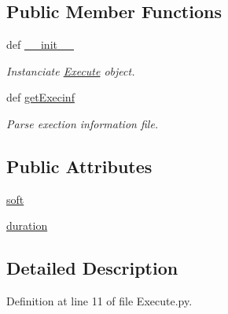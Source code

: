 \subsection*{\-Public \-Member \-Functions}
\begin{DoxyCompactItemize}
\item 
def \hyperlink{classirna_1_1iRNA__stat_1_1Execute_1_1Execute_ab9292cb8f95bb9eb9b83bd4ef8906ea0}{\-\_\-\-\_\-init\-\_\-\-\_\-}
\begin{DoxyCompactList}\small\item\em \-Instanciate \hyperlink{classirna_1_1iRNA__stat_1_1Execute_1_1Execute}{\-Execute} object. \end{DoxyCompactList}\item 
def \hyperlink{classirna_1_1iRNA__stat_1_1Execute_1_1Execute_ac444b068607bf9d7b65a3698ce9f5e5b}{get\-Execinf}
\begin{DoxyCompactList}\small\item\em \-Parse exection information file. \end{DoxyCompactList}\end{DoxyCompactItemize}
\subsection*{\-Public \-Attributes}
\begin{DoxyCompactItemize}
\item 
\hyperlink{classirna_1_1iRNA__stat_1_1Execute_1_1Execute_aa82d61e47b9d558c2e1d38c8a0f3ac62}{soft}
\item 
\hyperlink{classirna_1_1iRNA__stat_1_1Execute_1_1Execute_abc5962030e61cd50b643e52032192700}{duration}
\end{DoxyCompactItemize}


\subsection{\-Detailed \-Description}


\-Definition at line 11 of file \-Execute.\-py.



